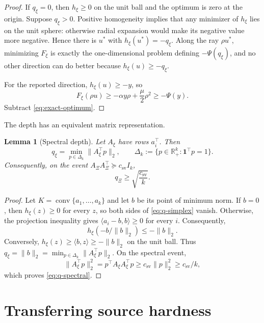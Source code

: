 \documentclass[11pt]{article}
\newcommand{\R}{\mathbb{R}}
\newcommand{\inner}[2]{\langle #1,#2\rangle}
\newcommand{\norm}[1]{\lVert #1\rVert_2}
\theoremstyle{plain}
\newtheorem{lemma}[lemma]{Lemma}
\theoremstyle{definition}
\begin{document}
\begin{proof}
If $q_\xi=0$, then $h_\xi\ge0$ on the unit ball and the optimum is zero at the origin.  Suppose $q_\xi>0$.  Positive homogeneity implies that any minimizer of $h_\xi$ lies on the unit sphere: otherwise radial expansion would make its negative value more negative.  Hence there is $u^*$ with $h_\xi(u^*)=-q_\xi$.  Along the ray $\rho u^*$, minimizing $F_\xi$ is exactly the one-dimensional problem defining $-\Psi(q_\xi)$, and no other direction can do better because $h_\xi(u)\ge-q_\xi$.

For the reported direction, $h_\xi(u)\ge-y$, so
\[
  F_\xi(\rho u)\ge-\alpha y\rho+\frac{\mu}{2}\rho^2\ge-\Psi(y).
\]
Subtract \eqref{eq:exact-optimum}.
\end{proof}

The depth has an equivalent matrix representation.

\begin{lemma}[Spectral depth]\label{lem:spectral-depth}
Let $A_\xi$ have rows $a_i^\top$.  Then
\begin{equation}\label{eq:q-simplex}
   q_\xi=\min_{p\in\Delta_k}\norm{A_\xi^\top p},
   \qquad
   \Delta_k:=\{p\in\R_+^k:\mathbf 1^\top p=1\}.
\end{equation}
Consequently, on the event $A_\Xi A_\Xi^\top\succeq c_{\mathrm{sv}}I_k$,
\begin{equation}\label{eq:q-spectral}
   q_\Xi\ge\sqrt{\frac{c_{\mathrm{sv}}}{k}}.
\end{equation}
\end{lemma}

\begin{proof}
Let $K=\operatorname{conv}\{a_1,\ldots,a_k\}$ and let $b$ be its
point of minimum norm. If $b=0$, then $h_\xi(z)\ge0$ for every $z$,
so both sides of \eqref{eq:q-simplex} vanish. Otherwise, the
projection inequality gives $\inner{a_i-b}{b}\ge0$ for every $i$.
Consequently,
\[
 h_\xi(-b/\norm{b})\le-\norm{b}.
\]
Conversely, $h_\xi(z)\ge\inner{b}{z}\ge-\norm{b}$ on the unit
ball. Thus $q_\xi=\norm{b}=\min_{p\in\Delta_k}\norm{A_\xi^\top p}$.
On the spectral event,
\[
 \norm{A_\xi^\top p}^2
 =p^\top A_\xi A_\xi^\top p
 \ge c_{\mathrm{sv}}\norm{p}^2
 \ge c_{\mathrm{sv}}/k,
\]
which proves \eqref{eq:q-spectral}.
\end{proof}

\section{Transferring source hardness}\label{sec:transfer}
\end{document}
